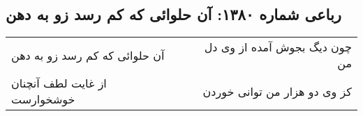 \begin{center}
\section*{رباعی شماره ۱۳۸۰: آن حلوائی که کم رسد زو به دهن}
\label{sec:1380}
\begin{longtable}{l p{0.5cm} r}
آن حلوائی که کم رسد زو به دهن
&&
چون دیگ بجوش آمده از وی دل من
\\
از غایت لطف آنچنان خوشخوارست
&&
کز وی دو هزار من توانی خوردن
\\
\end{longtable}
\end{center}
